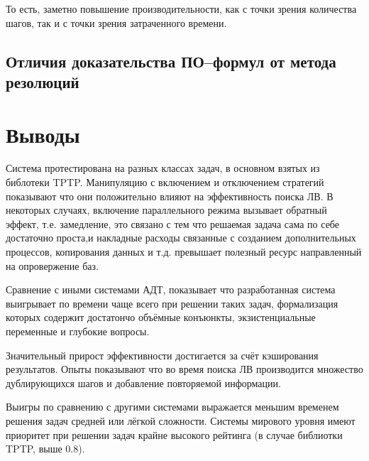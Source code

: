 То есть, заметно повышение производительности, как с точки зрения количества шагов, так и с точки зрения затраченного времени.


\subsection{Отличия доказательства ПО--формул от метода резолюций}


\section{Выводы}
Система протестирована на разных классах задач, в основном взятых из библотеки TPTP. Манипуляцию с включением и отключением стратегий показывают что они положительно влияют на эффективность поиска ЛВ. В некоторых случаях, включение параллельного режима вызывает обратный эффект, т.е. замедление, это связано с тем что решаемая задача сама по себе достаточно проста,и  накладные расходы связанные с созданием дополнительных процессов, копирования данных и т.д. превышает полезный ресурс направленный на опровержение баз. 

Сравнение с иными системами АДТ, показывает что разработанная система выигрывает по времени чаще всего при решении таких задач, формализация которых содержит достатончо объёмные конъюнкты, экзистенциальные переменные и глубокие вопросы. 

Значительный прирост эффективности достигается за счёт кэширования результатов. Опыты показывают что во время поиска ЛВ производится множество дублирующихся шагов и добавление повторяемой информации.

Выигры по сравнению с другими системами выражается меньшим временем решения задач средней или лёгкой сложности. Системы мирового уровня имеют приоритет при решении задач крайне высокого рейтинга (в случае библиотки TPTP, выше 0.8).  



